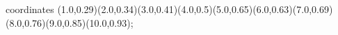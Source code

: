 					coordinates { (1.0,0.29)(2.0,0.34)(3.0,0.41)(4.0,0.5)(5.0,0.65)(6.0,0.63)(7.0,0.69)(8.0,0.76)(9.0,0.85)(10.0,0.93)};